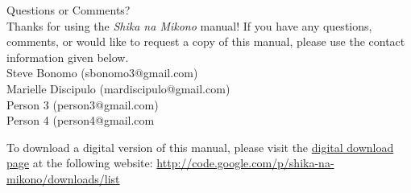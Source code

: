 \begin{center}
{\Huge Questions or Comments?}\\[12pt]
Thanks for using the \textit{Shika na Mikono} manual! If you have any questions, comments, or would like to request a copy of this manual, please use the contact information given below.\\[20pt]
Steve Bonomo (sbonomo3@gmail.com)\\
Marielle Discipulo (mardiscipulo@gmail.com)\\
Person 3 (person3@gmail.com)\\
Person 4 (person4@gmail.com
\end{center}
\vfill
To download a digital version of this manual, please visit the \href{http://code.google.com/p/shika-na-mikono/downloads/list}{digital download page} at the following website: \url{http://code.google.com/p/shika-na-mikono/downloads/list}